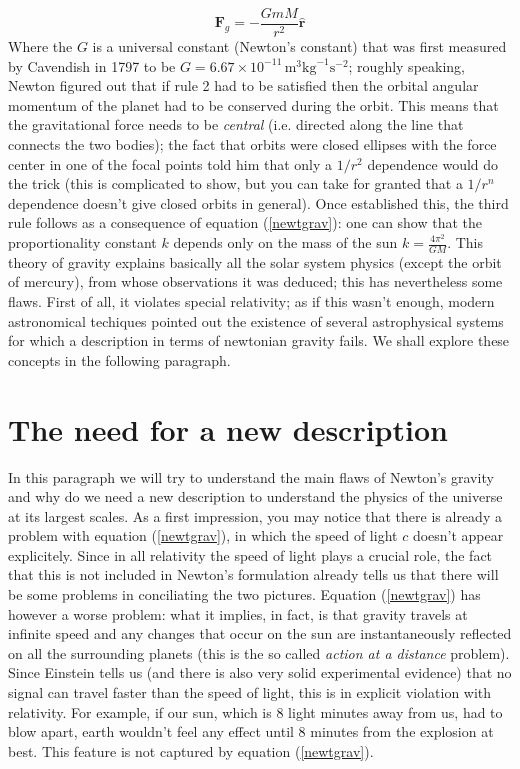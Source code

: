 \documentclass[11pt, a4paper,oneside,openright]{book}
\numberwithin{equation}{section}
\begin{document}
\begin{equation}
\label{newtgrav}
\mathbf{F}_g=-\frac{GmM}{r^2}\hat{\mathbf{r}}
\end{equation} 
Where the $G$ is a universal constant (Newton's constant) that was first measured by Cavendish in 1797 to be $G=6.67\times 10^{-11}\,\mathrm{m}^3\mathrm{kg}^{-1}\mathrm{s}^{-2}$; roughly speaking, Newton figured out that if rule 2 had to be satisfied then the orbital angular momentum of the planet had to be conserved during the orbit. This means that the gravitational force needs to be \textit{central} (i.e. directed along the line that connects the two bodies); the fact that orbits were closed ellipses with the force center in one of the focal points told him that only a $1/r^2$ dependence would do the trick (this is complicated to show, but you can take for granted that a $1/r^n$ dependence doesn't give closed orbits in general). Once established this, the third rule follows as a consequence of equation (\ref{newtgrav}): one can show that the proportionality constant $k$ depends only on the mass of the sun $k=\frac{4\pi^2}{GM}$. This theory of gravity explains basically all the solar system physics (except 
the orbit of mercury), from whose observations it was deduced; this has nevertheless some flaws. First of all, it violates special relativity; as if this wasn't enough, modern astronomical techiques pointed out the existence of several astrophysical systems for which a description in terms of newtonian gravity fails. We shall explore these concepts in the following paragraph. 

\section{The need for a new description}
In this paragraph we will try to understand the main flaws of Newton's gravity and why do we need a new description to understand the physics of the universe at its largest scales. As a first impression, you may notice that there is already a problem with equation (\ref{newtgrav}), in which the speed of light $c$ doesn't appear explicitely. Since in all relativity the speed of light plays a crucial role, the fact that this is not included in Newton's formulation already tells us that there will be some problems in conciliating the two pictures. Equation (\ref{newtgrav}) has however a worse problem: what it implies, in fact, is that gravity travels at infinite speed and any changes that occur on the sun are instantaneously reflected on all the surrounding planets (this is the so called \textit{action at a distance} problem). Since Einstein tells us (and there is also very solid experimental evidence) that no signal can travel faster than the speed of light, this is in explicit violation with relativity. For 
example, if our sun, which is 8 light minutes away from us, had to blow apart, earth wouldn't feel any effect until 8 minutes from the explosion at best. This feature is not captured by equation (\ref{newtgrav}). 
\end{document}

